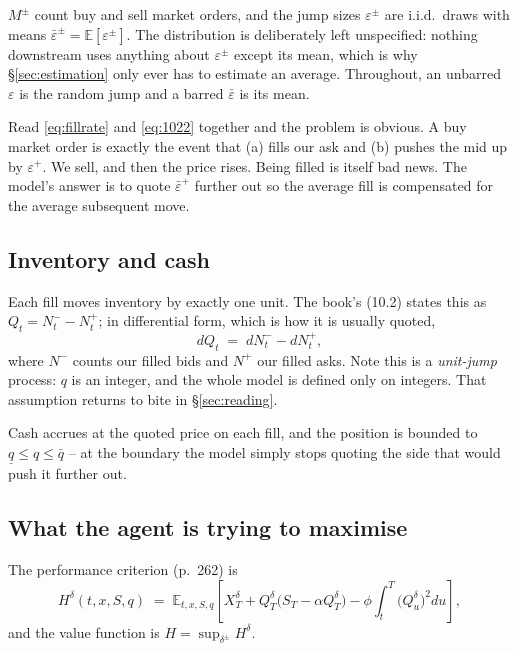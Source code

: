 \documentclass[11pt,a4paper]{article}
\newcommand{\dpm}{\delta^{\pm}}
\newcommand{\epsb}{\bar{\varepsilon}}
\begin{document}
$M^{\pm}$ count buy and sell market orders, and the jump sizes
$\varepsilon^{\pm}$ are i.i.d.\ draws with means $\epsb^{\pm} =
\mathbb{E}[\varepsilon^{\pm}]$. The distribution is deliberately left
unspecified: nothing downstream uses anything about $\varepsilon^{\pm}$ except
its mean, which is why \S\ref{sec:estimation} only ever has to estimate an
average. Throughout, an unbarred $\varepsilon$ is the random jump and a barred
$\epsb$ is its mean.

\begin{intuition}
Read \eqref{eq:fillrate} and \eqref{eq:1022} together and the problem is
obvious. A buy market order is exactly the event that (a) fills our ask and
(b) pushes the mid up by $\varepsilon^{+}$. We sell, and then the price rises.
Being filled is itself bad news. The model's answer is to quote $\epsb^{+}$
further out so the average fill is compensated for the average subsequent move.
\end{intuition}

\subsection{Inventory and cash}

Each fill moves inventory by exactly one unit. The book's (10.2) states this as
$Q_t = N^{-}_t - N^{+}_t$; in differential form, which is how it is usually
quoted,
\begin{equation}
  dQ_t \;=\; dN^{-}_t - dN^{+}_t,
  \tag{cf.\ 10.2}
\end{equation}
where $N^{-}$ counts our filled bids and $N^{+}$ our filled asks. Note this is a
\emph{unit-jump} process: $q$ is an integer, and the whole model is defined only
on integers. That assumption returns to bite in \S\ref{sec:reading}.

Cash accrues at the quoted price on each fill, and the position is bounded to
$\underline{q} \le q \le \bar{q}$ -- at the boundary the model simply stops
quoting the side that would push it further out.

\subsection{What the agent is trying to maximise}

The performance criterion (p.~262) is
\begin{equation}
  H^{\delta}(t,x,S,q) \;=\;
  \mathbb{E}_{t,x,S,q}\!\left[
    X^{\delta}_T + Q^{\delta}_T\bigl(S_T - \alpha Q^{\delta}_T\bigr)
    - \phi\!\int_t^T \bigl(Q^{\delta}_u\bigr)^2 du
  \right],
  \label{eq:criterion}
\end{equation}
and the value function is $H = \sup_{\dpm} H^{\delta}$.
\end{document}
